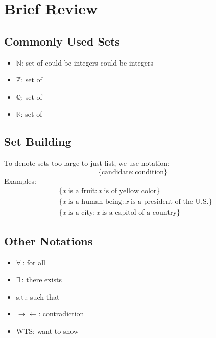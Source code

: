 \section{Brief Review}
\subsection*{Commonly Used Sets}
\begin{itemize}
  \item $\mathbb{N}$: set of 
        \subitem could be  integers
        \subitem could be  integers
  \item $\mathbb{Z}$: set of 
  \item $\mathbb{Q}$: set of 
  \item $\mathbb{R}$: set of 
\end{itemize}

\subsection*{Set Building}
To denote sets too large to just list, we use  notation:
\[
  \{\text{candidate}:\text{condition}\}
\]
Examples:
\begin{align*}
   & \{x~\text{is a fruit}: x~\text{is of yellow color}\}               \\
   & \{x~\text{is a human being}: x~\text{is a president of the U.S.}\} \\
   & \{x~\text{is a city}: x~\text{is a capitol of a country}\}
\end{align*}

\subsection*{Other Notations}
\begin{itemize}
  \item $\forall~$: for all
  \item $\exists~$: there exists
  \item s.t.: such that
  \item $\rightarrow \leftarrow$: contradiction
  \item WTS: want to show
\end{itemize}